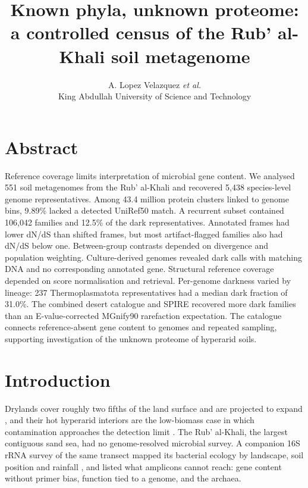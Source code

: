 \documentclass[11pt]{article}
\title{\textbf{Known phyla, unknown proteome:\\ a controlled census of the Rub' al-Khali soil metagenome}}
\author{A. Lopez Velazquez \textit{et al.}\\ \small King Abdullah University of Science and Technology}
\date{}
\begin{document}
\maketitle

\section*{Abstract}
Reference coverage limits interpretation of microbial gene content. We analysed 551 soil
metagenomes from the Rub' al-Khali and recovered 5{,}438 species-level genome representatives.
Among 43.4 million protein clusters linked to genome bins, 9.89\% lacked a detected UniRef50
match. A recurrent subset contained 106{,}042 families and 12.5\% of the dark representatives.
Annotated frames had lower dN/dS than shifted frames, but most artifact-flagged families also
had dN/dS below one. Between-group contrasts depended on divergence and population weighting.
Culture-derived genomes revealed dark calls with matching DNA and no corresponding annotated gene. Structural reference coverage
depended on score normalisation and retrieval. Per-genome darkness varied by lineage:
237 Thermoplasmatota representatives had a median dark fraction of 31.0\%. The combined desert catalogue and SPIRE
recovered more dark families than an E-value-corrected MGnify90 rarefaction expectation.
The catalogue connects reference-absent gene content to genomes and repeated sampling, supporting
investigation of the unknown proteome of hyperarid soils.

\section*{Introduction}

Drylands cover roughly two fifths of the land surface and are projected to expand
\citep{huang2016dryland,maestre2015aridity}, and their hot hyperarid interiors are the low-biomass
case in which contamination approaches the detection limit \citep{contamination2025guidelines}. The
Rub' al-Khali, the largest contiguous sand sea, had no genome-resolved microbial survey. A companion
16S rRNA survey of the same transect mapped its bacterial ecology by landscape, soil position and
rainfall \citep{tawfiq2026companion}, and listed what
amplicons cannot reach: gene content without primer bias, function tied to a genome, and the archaea.
\end{document}
